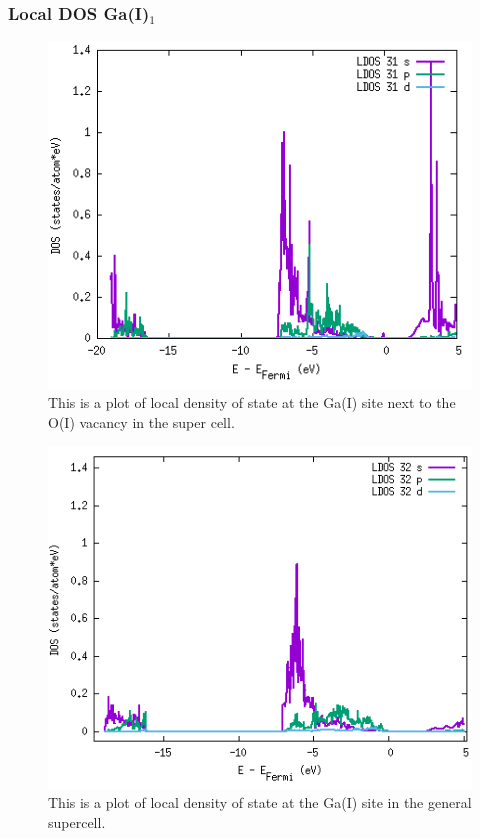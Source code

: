 \subsubsection{Local DOS Ga(I)$_1$}

\begin{figure}[H]
\includegraphics[width=\linewidth]{../fig/dosplot/ldos_Ga_I_OI_vac_nabo}\caption{This is a plot of local density of state at the Ga(I) site next to the O(I) vacancy in the super cell.}\label{fig:ldos_Ga_I_nabo}
\end{figure}

\begin{figure}[H]
\includegraphics[width=\linewidth]{../fig/dosplot/ldos_Ga_I_supercell}\caption{This is a plot of local density of state at the Ga(I) site in the general supercell.}\label{fig:ldos_Ga_I_supercell}
\end{figure}

